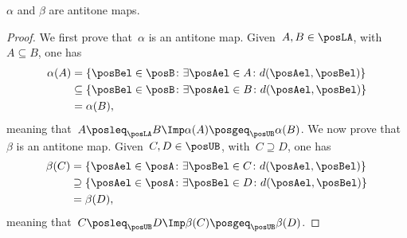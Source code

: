 \begin{lemma}
    \label{lem:alfabetaantitone}
    $\alpha$ and $\beta$ are antitone maps.
\end{lemma}
\begin{proof}
    We first prove that~$\alpha$ is an antitone map.
    Given~$A,B\in \posLA$, with~$A\subseteq B$, one has
    \begin{equation}
        \begin{aligned}
            \alpha(A) & =\{ \posBel\in \posB \colon \exists \posAel\in A\colon d(\posAel,\posBel)\}         \\
                      & \subseteq \{\posBel\in \posB \colon \exists \posAel\in B\colon d(\posAel,\posBel)\} \\
                      & =\alpha(B),
        \end{aligned}
    \end{equation}
    meaning that~$A\posleq_{\posLA} B\Imp \alpha(A) \posgeq_{\posUB} \alpha(B)$.
    We now prove that~$\beta$ is an antitone map.
    Given~$C,D\in \posUB$, with~$C\supseteq D$, one has
    \begin{equation}
        \begin{aligned}
            \beta(C) & =\{\posAel\in \posA\colon \exists \posBel\in C\colon d(\posAel,\posBel)\}           \\
                     & \supseteq \{\posAel\in \posA\colon \exists \posBel\in D \colon d(\posAel,\posBel)\} \\
                     & =\beta(D),
        \end{aligned}
    \end{equation}
    meaning that~$C\posleq_{\posUB} D \Imp \beta(C)\posgeq_{\posUB} \beta(D)$.
\end{proof}

